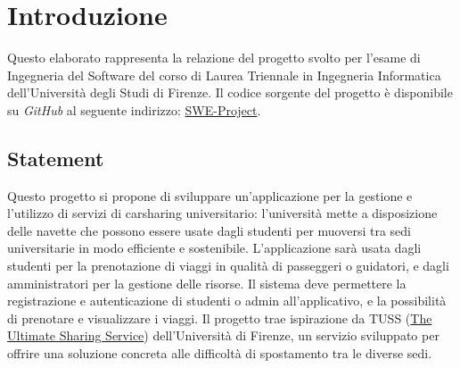 \section{Introduzione}\label{sec:Introduzione}
Questo elaborato rappresenta la relazione del progetto svolto per l'esame di Ingegneria del Software del corso di Laurea Triennale in Ingegneria Informatica dell'Università degli Studi di Firenze.
Il codice sorgente del progetto è disponibile su \textit{GitHub} al seguente indirizzo: \href{https://github.com/TommyAen/SWE-Project}{SWE-Project}.
\subsection{Statement}
Questo progetto si propone di sviluppare un'applicazione per la gestione e l'utilizzo di servizi di carsharing universitario: l'università mette a disposizione delle navette che possono essere usate dagli studenti per muoversi tra sedi universitarie in modo efficiente e sostenibile.
\newline
L'applicazione sarà usata dagli studenti per la prenotazione di viaggi in qualità di passeggeri o guidatori, e dagli amministratori per la gestione delle risorse.
Il sistema deve permettere la registrazione e autenticazione di studenti o admin all'applicativo, e la possibilità di prenotare e visualizzare i viaggi.
Il progetto trae ispirazione da TUSS (\href{https://www.tuss.unifi.it/}{The Ultimate Sharing Service}) dell'Università di Firenze, un servizio sviluppato per offrire una soluzione concreta alle difficoltà di spostamento tra le diverse sedi.
